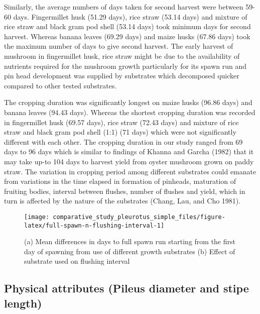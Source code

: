 \documentclass[]{article}
\begin{document}
Similarly, the average numbers of days taken for second harvest were between 59-60 days. Fingermillet husk (51.29 days), rice straw (53.14 days) and mixture of rice straw and black gram pod shell (53.14 days) took minimum days for second harvest. Whereas banana leaves (69.29 days) and maize husks (67.86 days) took the maximum number of days to give second harvest. The early harvest of mushroom in fingermillet husk, rice straw might be due to the availability of nutrients required for the mushroom growth particularly for its spawn run and pin head development was supplied by substrates which decomposed quicker compared to other tested substrates.

The cropping duration was significantly longest on maize husks (96.86 days) and banana leaves (94.43 days). Whereas the shortest cropping duration was recorded in fingermillet husk (69.57 days), rice straw (72.43 days) and mixture of rice straw and black gram pod shell (1:1) (71 days) which were not significantly different with each other. The cropping duration in our study ranged from 69 days to 96 days which is similar to findings of Khanna and Garcha (1982) that it may take up-to 104 days to harvest yield from oyster mushroom grown on paddy straw. The variation in cropping period among different substrates could emanate from variations in the time elapsed in formation of pinheads, maturation of fruiting bodies, interval between flushes, number of flushes and yield, which in turn is affected by the nature of the substrates (Chang, Lau, and Cho 1981).

\begin{figure}

{\centering \texttt{[image: comparative\_study\_pleurotus\_simple\_files/figure-latex/full-spawn-n-flushing-interval-1]} 

}

\caption{(a) Mean differences in days to full spawn run starting from the first day of spawning from use of different growth substrates (b) Effect of substrate used on flushing interval}\label{fig:full-spawn-n-flushing-interval}
\end{figure}

\hypertarget{physical-attributes-pileus-diameter-and-stipe-length}{%
\subsection{Physical attributes (Pileus diameter and stipe length)}\label{physical-attributes-pileus-diameter-and-stipe-length}}
\end{document}
